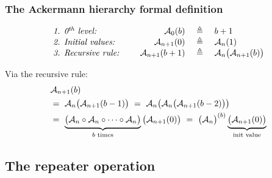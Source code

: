 \begin{frame}
\frametitle{The Ackermann hierarchy formal definition}
\begin{equation*}
\begin{array}{lrcl}
\textit{1. 0$^{\textit{th}}$ level: } & \mathcal{A}_0(b) & ~ \triangleq ~ & b + 1 \\
\textit{2. Initial values: } & \mathcal{A}_{n+1}(0) & ~ \triangleq ~ & \mathcal{A}_n(1) \\
\textit{3. Recursive rule: } \quad & \mathcal{A}_{n+1}(b+1) & ~ \triangleq ~ & \mathcal{A}_n\big(\mathcal{A}_{n+1}(b)\big)
\end{array}
\end{equation*}

Via the recursive rule:
\begin{equation*}
\begin{aligned}
& \mathcal{A}_{n+1}(b) \\
& = ~ \mathcal{A}_n\big(\mathcal{A}_{n+1}(b-1)\big) ~ = ~ \mathcal{A}_n\big(\mathcal{A}_n\big(\mathcal{A}_{n+1}(b-2)\big)\big) \\
& = ~ \underbrace{\big( \mathcal{A}_n\circ \mathcal{A}_n\circ \cdots \circ \mathcal{A}_n \big)}_{b \text{ times}} \big(\mathcal{A}_{n+1}(0)\big)  ~ = ~ \big(\mathcal{A}_n\big)^{(b)}\underbrace{\big(\mathcal{A}_{n+1}(0)\big)}_{\text{init value}}
\end{aligned}
\end{equation*}

\end{frame}


\subsection{The repeater operation}


